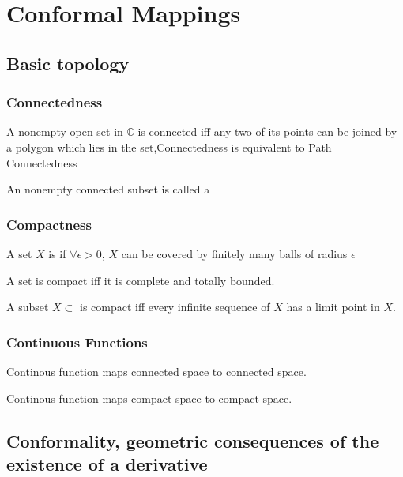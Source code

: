 \section{Conformal Mappings}
\subsection{Basic topology}
\subsubsection{Connectedness}
\begin{theorem}
    A nonempty open set in  $ \mathbb{C} $ is connected iff any two of its points can be joined by a polygon  which lies in the set,\ie Connectedness is equivalent to Path Connectedness
\end{theorem}
An nonempty connected subset is called a 
\subsubsection{Compactness}
\begin{definition}
    A set  $ X  $ is  if  $ \forall \epsilon>0  $,  $ X  $ can be covered by finitely many balls of radius  $ \epsilon  $ 
    
\end{definition}
\begin{theorem}
    A set is compact iff it is complete and totally bounded.
\end{theorem}
\begin{theorem}
    A subset  $ X\subset $ is compact iff every infinite sequence of  $ X  $ has a limit point in  $ X  $.
\end{theorem}
\subsubsection{Continuous Functions}
\begin{theorem}
    Continous function maps connected space to connected space.
\end{theorem}
\begin{theorem}
    Continous function maps compact space to compact space.
\end{theorem}
\subsection{Conformality, geometric consequences of the existence of a derivative}
